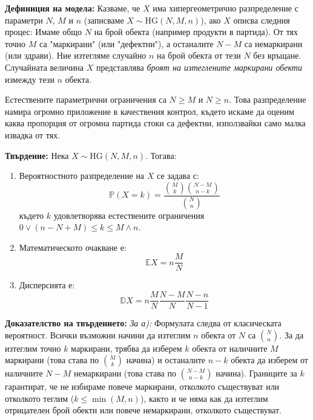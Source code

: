 \documentclass{article}
\begin{document}
\textbf{Дефиниция на модела:}
Казваме, че $X$ има хипергеометрично разпределение с параметри $N$, $M$ и $n$ (записваме $X \sim \text{HG}(N, M, n)$), ако $X$ описва следния процес:
Имаме общо $N$ на брой обекта (например продукти в партида). От тях точно $M$ са "маркирани" (или "дефектни"), а останалите $N - M$ са немаркирани (или здрави). Ние изтегляме случайно $n$ на брой обекта от тези $N$ без връщане. Случайната величина $X$ представлява \textit{броят на изтеглените маркирани обекти} измежду тези $n$ обекта. 

Естествените параметрични ограничения са $N \ge M$ и $N \ge n$. Това разпределение намира огромно приложение в качествения контрол, където искаме да оценим каква пропорция от огромна партида стоки са дефектни, използвайки само малка извадка от тях.

\textbf{Твърдение:} Нека $X \sim \text{HG}(N, M, n)$. Тогава:
\begin{enumerate}
    \item[а)] Вероятностното разпределение на $X$ се задава с:
    \[
    \mathbb{P}(X = k) = \frac{\binom{M}{k} \binom{N-M}{n-k}}{\binom{N}{n}}
    \]
    където $k$ удовлетворява естествените ограничения $0 \lor (n - N + M) \le k \le M \land n$. 
    \item[б)] Математическото очакване е:
    \[
    \mathbb{E}X = n \frac{M}{N}
    \]
    \item[в)] Дисперсията е:
    \[
    \mathbb{D}X = n \frac{M}{N} \frac{N-M}{N} \frac{N-n}{N-1}
    \]
\end{enumerate}

\textbf{Доказателство на твърдението:}
\textit{За а):} Формулата следва от класическата вероятност. Всички възможни начини да изтеглим $n$ обекта от $N$ са $\binom{N}{n}$. За да изтеглим точно $k$ маркирани, трябва да изберем $k$ обекта от наличните $M$ маркирани (това става по $\binom{M}{k}$ начина) и останалите $n-k$ обекта да изберем от наличните $N-M$ немаркирани (това става по $\binom{N-M}{n-k}$ начина). Границите за $k$ гарантират, че не избираме повече маркирани, отколкото съществуват или отколкото теглим ($k \le \min(M, n)$), както и че няма как да изтеглим отрицателен брой обекти или повече немаркирани, отколкото съществуват.
\end{document}
